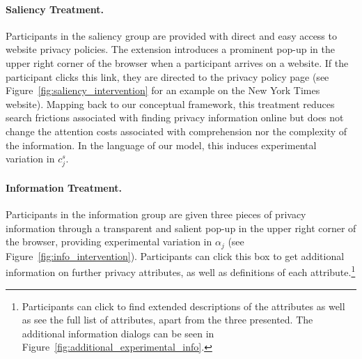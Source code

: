 \documentclass[12pt]{article}
\theoremstyle{definition}
\theoremstyle{remark}
\begin{document}
\paragraph{Saliency Treatment.} Participants in the saliency group are provided with direct and easy access to website privacy policies. The extension introduces a prominent pop-up in the upper right corner of the browser when a participant arrives on a website. If the participant clicks this link, they are directed to the privacy policy page (see Figure~\ref{fig:saliency_intervention} for an example on the New York Times website). Mapping back to our conceptual framework, this treatment reduces search frictions associated with finding privacy information online but does not change the attention costs associated with comprehension nor the complexity of the information. In the language of our model, this induces experimental variation in $c^s_j$.

\paragraph{Information Treatment.} Participants in the information group are given three pieces of privacy information through a transparent and salient pop-up in the upper right corner of the browser, providing experimental variation in $\alpha_j$ (see Figure~\ref{fig:info_intervention}). Participants can click this box to get additional information on further privacy attributes, as well as definitions of each attribute.\footnote{Participants can click to find extended descriptions of the attributes as well as see the full list of attributes, apart from the three presented. The additional information dialogs can be seen in Figure~\ref{fig:additional_experimental_info}.} 
\end{document}
